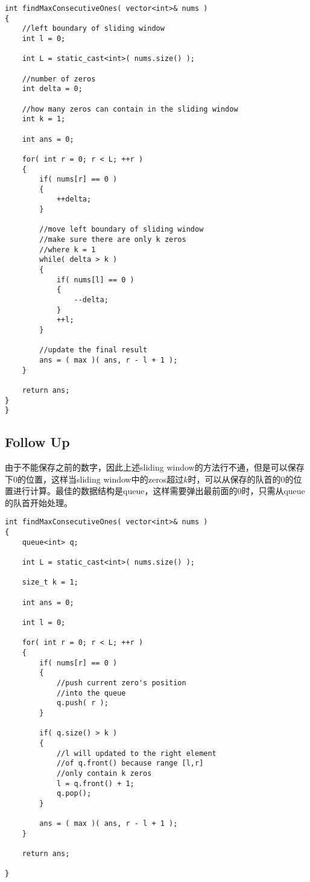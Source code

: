 \begin{lstlisting}[style=customc, caption={Sliding Window}]
int findMaxConsecutiveOnes( vector<int>& nums )
{
    //left boundary of sliding window
    int l = 0;

    int L = static_cast<int>( nums.size() );

    //number of zeros
    int delta = 0;

    //how many zeros can contain in the sliding window
    int k = 1;

    int ans = 0;

    for( int r = 0; r < L; ++r )
    {
        if( nums[r] == 0 )
        {
            ++delta;
        }

        //move left boundary of sliding window
        //make sure there are only k zeros
        //where k = 1
        while( delta > k )
        {
            if( nums[l] == 0 )
            {
                --delta;
            }
            ++l;
        }

        //update the final result
        ans = ( max )( ans, r - l + 1 );
    }

    return ans;
}
}
\end{lstlisting}

\subsection{Follow Up}
由于不能保存之前的数字，因此上述sliding window的方法行不通，但是可以保存下0的位置，这样当sliding window中的zeros超过$k$时，可以从保存的队首的0的位置进行计算。最佳的数据结构是queue，这样需要弹出最前面的$0$时，只需从queue的队首开始处理。

\begin{lstlisting}[style=customc, caption={Queue}]
int findMaxConsecutiveOnes( vector<int>& nums )
{
    queue<int> q;

    int L = static_cast<int>( nums.size() );

    size_t k = 1;

    int ans = 0;

    int l = 0;

    for( int r = 0; r < L; ++r )
    {
        if( nums[r] == 0 )
        {
            //push current zero's position
            //into the queue
            q.push( r );
        }

        if( q.size() > k )
        {
            //l will updated to the right element
            //of q.front() because range [l,r]
            //only contain k zeros
            l = q.front() + 1;
            q.pop();
        }

        ans = ( max )( ans, r - l + 1 );
    }

    return ans;

}
\end{lstlisting}